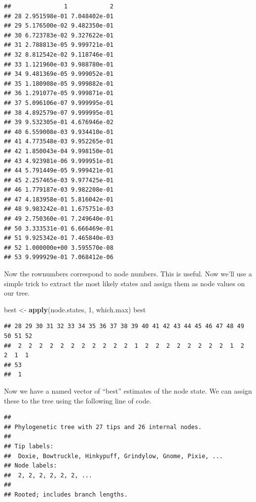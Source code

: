 \documentclass[]{book}
\newenvironment{Shaded}{\begin{snugshade}}{\end{snugshade}}
\newcommand{\KeywordTok}[1]{\textcolor[rgb]{0.13,0.29,0.53}{\textbf{{#1}}}}
\newcommand{\DecValTok}[1]{\textcolor[rgb]{0.00,0.00,0.81}{{#1}}}
\newcommand{\StringTok}[1]{\textcolor[rgb]{0.31,0.60,0.02}{{#1}}}
\newcommand{\NormalTok}[1]{{#1}}
\begin{document}
\begin{verbatim}
##               1            2
## 28 2.951598e-01 7.048402e-01
## 29 5.176500e-02 9.482350e-01
## 30 6.723783e-02 9.327622e-01
## 31 2.788813e-05 9.999721e-01
## 32 8.812542e-02 9.118746e-01
## 33 1.121960e-03 9.988780e-01
## 34 9.481369e-05 9.999052e-01
## 35 1.180908e-05 9.999882e-01
## 36 1.291077e-05 9.999871e-01
## 37 5.096106e-07 9.999995e-01
## 38 4.892579e-07 9.999995e-01
## 39 9.532305e-01 4.676946e-02
## 40 6.559008e-03 9.934410e-01
## 41 4.773548e-03 9.952265e-01
## 42 1.850043e-04 9.998150e-01
## 43 4.923981e-06 9.999951e-01
## 44 5.791449e-05 9.999421e-01
## 45 2.257465e-03 9.977425e-01
## 46 1.779187e-03 9.982208e-01
## 47 4.183958e-01 5.816042e-01
## 48 9.983242e-01 1.675751e-03
## 49 2.750360e-01 7.249640e-01
## 50 3.333531e-01 6.666469e-01
## 51 9.925342e-01 7.465840e-03
## 52 1.000000e+00 3.595570e-08
## 53 9.999929e-01 7.068412e-06
\end{verbatim}

Now the rownumbers correspond to node numbers. This is useful. Now we'll
use a simple trick to extract the most likely states and assign them as
node values on our tree.

\begin{Shaded}
\begin{Highlighting}[]
\NormalTok{best <-}\StringTok{ }\KeywordTok{apply}\NormalTok{(node.states, }\DecValTok{1}\NormalTok{, which.max)}
\NormalTok{best}
\end{Highlighting}
\end{Shaded}

\begin{verbatim}
## 28 29 30 31 32 33 34 35 36 37 38 39 40 41 42 43 44 45 46 47 48 49 50 51 52 
##  2  2  2  2  2  2  2  2  2  2  2  1  2  2  2  2  2  2  2  2  1  2  2  1  1 
## 53 
##  1
\end{verbatim}

Now we have a named vector of ``best'' estimates of the node state. We
can assign these to the tree using the following line of code.

\begin{Shaded}
\end{Shaded}

\begin{verbatim}
## 
## Phylogenetic tree with 27 tips and 26 internal nodes.
## 
## Tip labels:
##  Doxie, Bowtruckle, Hinkypuff, Grindylow, Gnome, Pixie, ...
## Node labels:
##  2, 2, 2, 2, 2, 2, ...
## 
## Rooted; includes branch lengths.
\end{verbatim}
\end{document}
